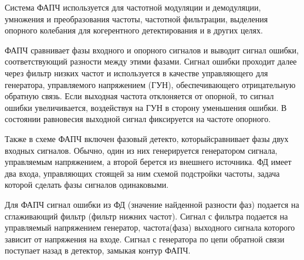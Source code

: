 \documentclass[10pt,a4paper]{article}
\begin{document}
Система ФАПЧ используется для частотной модуляции и демодуляции, умножения и преобразования частоты, частотной фильтрации, выделения опорного колебания для когерентного детектирования и в других целях.

ФАПЧ сравнивает фазы входного и опорного сигналов и выводит сигнал ошибки, соответствующий разности между этими фазами. Сигнал ошибки проходит далее через фильтр низких частот и используется в качестве управляющего для генератора, управляемого напряжением (ГУН), обеспечивающего отрицательную обратную связь. Если выходная частота отклоняется от опорной, то сигнал ошибки увеличивается, воздействуя на ГУН в сторону уменьшения ошибки. В состоянии равновесия выходной сигнал фиксируется на частоте опорного.

Также в схеме ФАПЧ включен фазовый детекто, которыйсравнивает фазы двух входных сигналов. Обычно, один из них генерируется генератором сигнала, управляемым напряжением, а второй берется из внешнего источника. ФД имеет два входа, управляющих стоящей за ним схемой подстройки частоты, задача которой сделать фазы сигналов одинаковыми.

Для ФАПЧ сигнал ошибки из ФД (значение найденной разности фаз) подается на сглаживающий фильтр (фильтр нижних частот). Сигнал с фильтра подается на управляемый напряжением генератор, частота(фаза) выходного сигнала которого зависит от напряжения на входе. Сигнал с генератора по цепи обратной связи поступает назад в детектор, замыкая контур ФАПЧ.
\end{document}
